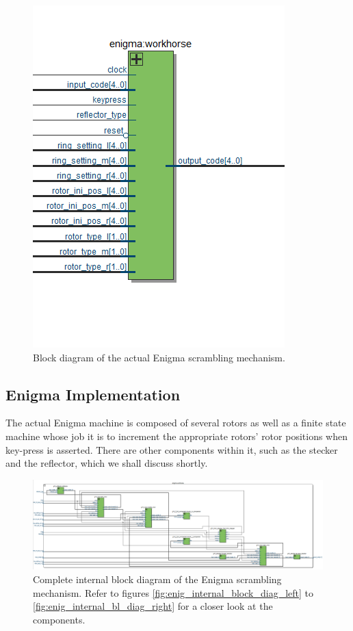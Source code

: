 \documentclass{article}
\begin{document}
\begin{figure}[ht!]
    \centering
    \includegraphics[scale=0.5]{enigma_block_diag.PNG}
    \caption{Block diagram of the actual Enigma scrambling mechanism.}
    \label{fig:enig_block_diag}
\end{figure}

\subsection{Enigma Implementation}
The actual Enigma machine is composed of several rotors as well as a finite state machine whose job it is to increment the appropriate rotors' rotor positions when key-press is asserted. There are other components within it, such as the stecker and the reflector, which we shall discuss shortly. 

\begin{figure}[ht!]
    \centering
    \includegraphics[scale=0.23]{enig_internal_block_diag.PNG}
    \caption{Complete internal block diagram of the Enigma scrambling mechanism. Refer to figures \ref{fig:enig_internal_block_diag_left} to \ref{fig:enig_internal_bl_diag_right} for a closer look at the components.}
    \label{fig:enig_internal_block_diag}
\end{figure}
\end{document}

